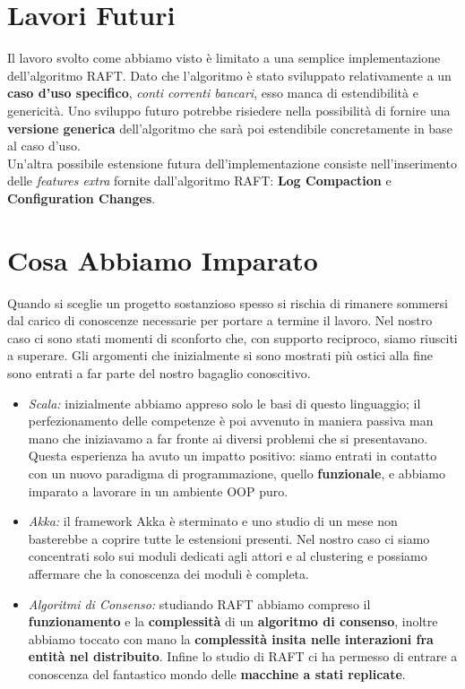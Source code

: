 \section{Lavori Futuri}
  Il lavoro svolto come abbiamo visto è limitato a una semplice implementazione dell'algoritmo RAFT. Dato che l'algoritmo è stato sviluppato relativamente a un \textbf{caso d'uso specifico}, \textit{conti correnti bancari}, esso manca di estendibilità e genericità. Uno sviluppo futuro potrebbe risiedere nella possibilità di fornire una \textbf{versione generica} dell'algoritmo che sarà poi estendibile concretamente in base al caso d'uso.\\
  Un'altra possibile estensione futura dell'implementazione consiste nell'inserimento delle \textit{features extra} fornite dall'algoritmo RAFT: \textbf{Log Compaction} e \textbf{Configuration Changes}.

\section{Cosa Abbiamo Imparato}
  Quando si sceglie un progetto sostanzioso spesso si rischia di rimanere sommersi dal carico di conoscenze necessarie per portare a termine il lavoro. Nel nostro caso ci sono stati momenti di sconforto che, con supporto reciproco, siamo riusciti a superare. Gli argomenti che inizialmente si sono mostrati più ostici alla fine sono entrati a far parte del nostro bagaglio conoscitivo.
  \begin{itemize}
    \item{\emph{Scala:}}
    inizialmente abbiamo appreso solo le basi di questo linguaggio; il perfezionamento delle competenze è poi avvenuto in maniera passiva man mano che iniziavamo a far fronte ai diversi problemi che si presentavano. Questa esperienza ha avuto un impatto positivo: siamo entrati in contatto con un nuovo paradigma di programmazione, quello \textbf{funzionale}, e abbiamo imparato a lavorare in un ambiente OOP puro.
    \item{\emph{Akka:}}
    il framework Akka è sterminato e uno studio di un mese non basterebbe a coprire tutte le estensioni presenti. Nel nostro caso ci siamo concentrati solo sui moduli dedicati agli attori e al clustering e possiamo affermare che la conoscenza dei moduli è completa.
    \item{\emph{Algoritmi di Consenso:}}
    studiando RAFT abbiamo compreso il \textbf{funzionamento} e la \textbf{complessità} di un \textbf{algoritmo di consenso}, inoltre abbiamo toccato con mano la \textbf{complessità insita nelle interazioni fra entità nel distribuito}. Infine lo studio di RAFT ci ha permesso di entrare a conoscenza del fantastico mondo delle \textbf{macchine a stati replicate}.
  \end{itemize}

